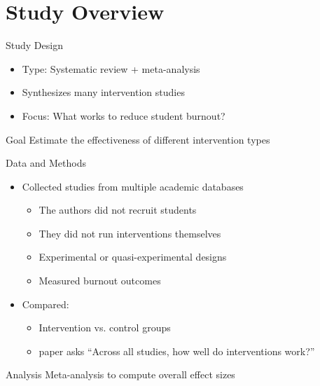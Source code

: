 \documentclass[dvipsnames]{beamer}
\begin{document}
\section{Study Overview}

\begin{frame}{Study Design}
\begin{itemize}
    \item Type: Systematic review + meta-analysis
    \item Synthesizes many intervention studies
    \item Focus: What works to reduce student burnout?
\end{itemize}



\begin{block}{Goal}
Estimate the effectiveness of different intervention types
\end{block}

\end{frame}


\begin{frame}{Data and Methods}
\begin{itemize}
    \item Collected studies from multiple academic databases

    \begin{itemize}
    \item The authors did not recruit students
    \item They did not run interventions themselves
    \item Experimental or quasi-experimental designs
    \item Measured burnout outcomes
    \end{itemize}
    \item Compared:
    \begin{itemize}
        \item Intervention vs. control groups
        \item paper asks “Across all studies, how well do interventions work?”
    \end{itemize}
\end{itemize}


\begin{block}{Analysis}
Meta-analysis to compute overall effect sizes
\end{block}

\end{frame}
\end{document}
